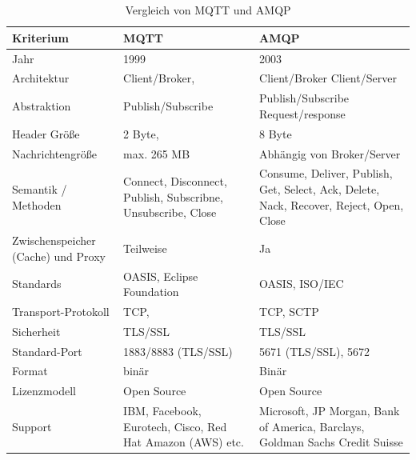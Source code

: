 \documentclass[
  ngerman           %
  ,twoside          %
  ,11pt
  ,pdftex
]{report}
\begin{document}
\chapter{}
\label{appendix:mqtt-amqp}
  \begin{table}[hbt!]
    \begin{center}
      \begin{tabular}{| p{3.25cm} | p{6cm} | p{6cm} | }
        \hline
          \textbf{Kriterium} & \textbf{MQTT} & \textbf{AMQP}\\
        \hline
          Jahr & 1999 & 2003 \\ 
        \hline
          Architektur & Client/Broker, & Client/Broker Client/Server \\ 
        \hline
          Abstraktion & Publish/Subscribe & Publish/Subscribe Request/response \\ 
        \hline
          Header Größe & 2 Byte,  & 8 Byte \\ 
        \hline
          Nachrichtengröße & max. 265 MB & Abhängig von Broker/Server \\ 
        \hline 
          Semantik / Methoden & Connect, Disconnect, Publish, Subscribne, Unsubscribe, Close & Consume, Deliver, Publish, Get, Select, Ack, Delete, Nack, Recover, Reject, Open, Close \\
        \hline
          Zwischenspeicher (Cache) und Proxy & Teilweise & Ja \\
        \hline
          Standards & OASIS, Eclipse Foundation  & OASIS, ISO/IEC \\ 
        \hline
          Transport-Protokoll & TCP, & TCP, SCTP \\
        \hline
          Sicherheit & TLS/SSL & TLS/SSL \\ 
        \hline
          Standard-Port & 1883/8883 (TLS/SSL) & 5671 (TLS/SSL), 5672 \\
        \hline
          Format & binär  & Binär \\ 
        \hline
          Lizenzmodell & Open Source & Open Source \\
        \hline
          Support & IBM, Facebook, Eurotech, Cisco, Red Hat Amazon (AWS) etc. & Microsoft, JP Morgan, Bank of America, Barclays, Goldman Sachs Credit Suisse \\ 
        \hline
      \end{tabular}
    \end{center}
    \caption{Vergleich von MQTT und AMQP \cite{Naik2017}}
    \label{tab:mqtt-vs-amqp}
  \end{table}
\end{document}
